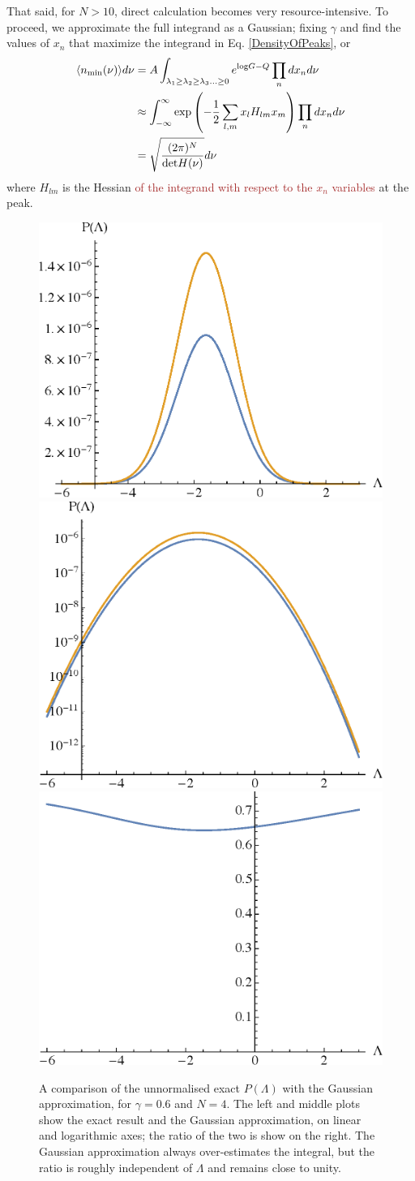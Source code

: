 \documentclass[12pt]{article}
\newcommand{\sh}[1]{\textcolor{brown}{#1}}
\begin{document}
That said, for $N>10$, direct calculation becomes very resource-intensive. To proceed, we approximate the full integrand as a Gaussian; fixing $\gamma$ and find the values of $x_n$ that maximize the integrand in Eq. \ref{DensityOfPeaks}, or 
%
\begin{align*}
\begin{split}
\langle n_{\rm min}(\nu)\rangle d\nu &=A\int_{\lambda_1 \geq \lambda_2 \geq \lambda_3 \ldots \geq 0} e^{\mathrm{log}G-Q} \prod_n dx_n d\nu\\
&\approx \int_{-\infty}^{\infty} \exp\left(-\frac{1}{2}\sum_{l,m}x_lH_{lm}x_m\right)  \prod_n dx_n d\nu \\
&= \sqrt{\frac{(2\pi)^N}{\mathrm{det} H(\nu)}}d\nu
\end{split}
\end{align*}
%
\noindent where $H_{lm}$ is the Hessian \sh{of the integrand with respect to the $x_n$ variables} at the peak.
\begin{figure} 
  \centering
  \includegraphics[width=.3 \linewidth]{PLam_approx.eps} \hfill
   \includegraphics[width=.3 \linewidth]{PLam_approx_log.eps} \hfill
    \includegraphics[width=.3 \linewidth]{PLam_ratio.eps}
  \caption{  
  A comparison of the unnormalised exact $P(\Lambda)$ with the Gaussian approximation, for $\gamma=0.6$ and $N=4$. The left and middle plots show the exact result and the Gaussian approximation, on linear and logarithmic axes; the ratio of the two is show on the right. The Gaussian approximation always  over-estimates the integral, but the ratio is roughly independent of $\Lambda$ and remains close to unity. }
  \label{Comparison}
\end{figure}
\end{document}
